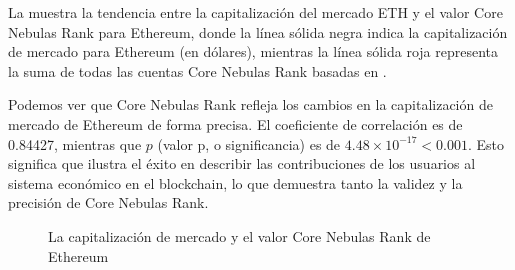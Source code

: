 La  muestra la tendencia entre la capitalización del mercado ETH y el valor
Core Nebulas Rank para Ethereum, donde la línea sólida negra indica
la capitalización de mercado para Ethereum (en dólares), mientras la línea sólida roja representa
la suma de todas las cuentas Core Nebulas Rank basadas en .

Podemos ver que Core Nebulas Rank refleja los cambios en la capitalización de mercado de Ethereum de forma precisa. El coeficiente de correlación es de 0.84427, mientras que $p$
(valor p, o significancia) es de $4.48\times{}10^{-17}<0.001$. Esto significa que  ilustra el éxito en describir las contribuciones de los usuarios al sistema económico en el blockchain, lo que demuestra tanto la validez y la precisión de Core Nebulas Rank.


\begin{figure}
\centering
{}
\caption{La capitalización de mercado y el valor Core Nebulas Rank de Ethereum}
\label{fig-eth-simu}
\end{figure}